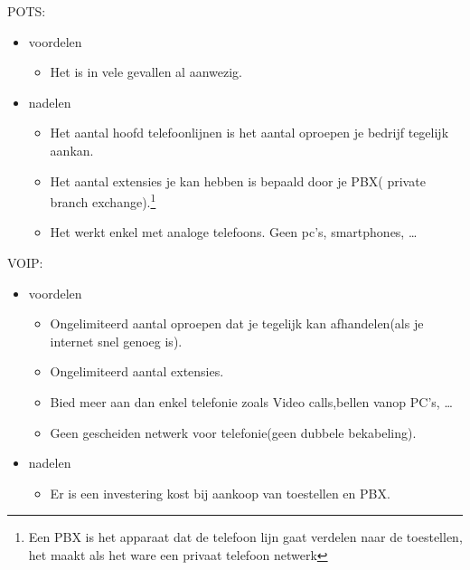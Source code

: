 \documentclass[pdftex,a4paper,12pt,twoside]{report}
\begin{document}
POTS: 
\begin{itemize}
	\item voordelen
	\begin{itemize}
		\item Het is in vele gevallen al aanwezig.
	\end{itemize}
	\item nadelen
	\begin{itemize}
		\item Het aantal hoofd telefoonlijnen is het aantal oproepen je bedrijf tegelijk aankan. 
		\item Het aantal extensies je kan hebben is bepaald door je PBX( private branch exchange).\footnote{Een PBX is het apparaat dat de telefoon lijn gaat verdelen naar de toestellen, het maakt als het ware een privaat telefoon netwerk}
		\item Het werkt enkel met analoge telefoons. Geen pc's, smartphones, \ldots
	\end{itemize}
\end{itemize} 
VOIP: 
\begin{itemize}
	\item voordelen
	\begin{itemize}
		\item Ongelimiteerd aantal oproepen dat je tegelijk kan afhandelen(als je internet snel genoeg is).
		\item Ongelimiteerd aantal extensies.
		\item Bied meer aan dan enkel telefonie zoals Video calls,bellen vanop PC's, \ldots
		\item Geen gescheiden netwerk voor telefonie(geen dubbele bekabeling).
	\end{itemize}
	\item nadelen
	\begin{itemize}
		\item Er is een investering kost bij aankoop van toestellen en PBX.
	\end{itemize}
\end{itemize} 
\end{document}
